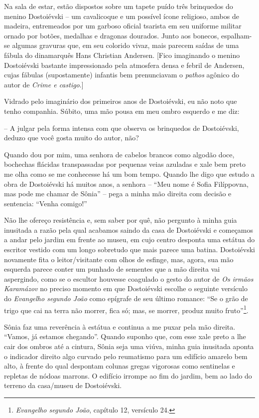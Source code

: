 Na sala de estar, estão dispostos sobre um tapete puído três brinquedos
do menino Dostoiévski -- um cavalicoque e um possível ícone religioso,
ambos de madeira, entremeados por um garboso oficial tsarista em seu
uniforme militar ornado por botões, medalhas e dragonas dourados. Junto
aos bonecos, espalham-se algumas gravuras que, em seu colorido vivaz,
mais parecem saídas de uma fábula do dinamarquês Hans Christian
Andersen. {[}Fico imaginando o menino Dostoiévski bastante impressionado
pela atmosfera densa e febril de Andersen, cujas fábulas (supostamente)
infantis bem prenunciavam o \emph{pathos} agônico do autor de
\emph{Crime e castigo}.{]}

Vidrado pelo imaginário dos primeiros anos de Dostoiévski, eu não noto
que tenho companhia. Súbito, uma mão pousa em meu ombro esquerdo e me
diz:

-- A julgar pela forma intensa com que observa os brinquedos de
Dostoiévski, deduzo que você gosta muito do autor, não?

Quando dou por mim, uma senhora de cabelos brancos como algodão doce,
bochechas flácidas transpassadas por pequenas veias azuladas e xale bem
preto me olha como se me conhecesse há um bom tempo. Quando lhe digo que
estudo a obra de Dostoiévski há muitos anos, a senhora -- ``Meu nome é
Sofia Filíppovna, mas pode me chamar de Sônia'' -- pega a minha mão
direita com decisão e sentencia: ``Venha comigo!''

Não lhe ofereço resistência e, sem saber por quê, não pergunto à minha
guia inusitada a razão pela qual acabamos saindo da casa de Dostoiévski
e começamos a andar pelo jardim em frente ao museu, em cujo centro
desponta uma estátua do escritor vestido com um longo sobretudo que mais
parece uma batina. Dostoiévski novamente fita o leitor/visitante com
olhos de esfinge, mas, agora, sua mão esquerda parece conter um punhado
de sementes que a mão direita vai aspergindo, como se o escultor
houvesse coagulado o gesto do autor de \emph{Os irmãos Karamázov} no
preciso momento em que Dostoiévski escolhe o seguinte versículo do
\emph{Evangelho segundo João} como epígrafe de seu último romance: ``Se
o grão de trigo que cai na terra não morrer, fica só; mas, se morrer,
produz muito fruto''\footnote{\emph{Evangelho segundo João}, capítulo
  12, versículo 24.}.

Sônia faz uma reverência à estátua e continua a me puxar pela mão
direita. ``Vamos, já estamos chegando''. Quando suponho que, com esse
xale preto a lhe cair dos ombros até a cintura, Sônia seja uma viúva,
minha guia inusitada aponta o indicador direito algo curvado pelo
reumatismo para um edifício amarelo bem alto, à frente do qual despontam
colunas gregas vigorosas como sentinelas e repletas de nódoas marrons. O
edifício irrompe ao fim do jardim, bem ao lado do terreno da casa/museu
de Dostoiévski.

